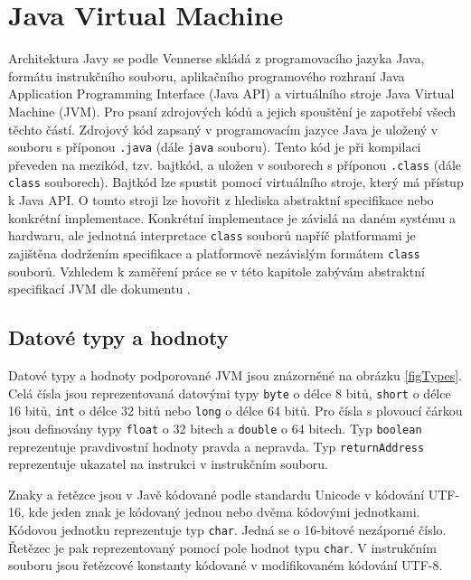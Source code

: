 \chapter{Java Virtual Machine}\label{JVM}

Architektura Javy se podle Vennerse \cite{Venners:InsideJVM} skládá z programovacího jazyka Java, formátu instrukčního souboru, aplikačního programového rozhraní Java Application Programming Interface (Java API) a virtuálního stroje Java Virtual Machine (JVM). Pro psaní zdrojových kódů a jejich spouštění je zapotřebí všech těchto částí.
Zdrojový kód zapsaný v programovacím jazyce Java je uložený v souboru s příponou \texttt{.java} (dále \texttt{java} souboru). Tento kód je při kompilaci převeden na mezikód, tzv. bajtkód, a uložen v souborech s příponou \texttt{.class} (dále \texttt{class} souborech). Bajtkód lze spustit pomocí virtuálního stroje, který má přístup k Java API. O tomto stroji lze  hovořit z hlediska abstraktní specifikace nebo konkrétní implementace. Konkrétní implementace je závislá na daném systému a hardwaru, ale jednotná interpretace \texttt{class} souborů napříč platformami je zajištěna dodržením specifikace a platformově nezávislým formátem \texttt{class} souborů. Vzhledem k zaměření práce se v této kapitole zabývám abstraktní specifikací JVM dle dokumentu \cite{Lindholm:JVM}. 

\section{Datové typy a hodnoty}\label{JVMTypes}

Datové typy a hodnoty podporované JVM jsou znázorněné na obrázku \ref{figTypes}. Celá čísla jsou reprezentovaná datovými typy \texttt{byte} o délce 8 bitů, \texttt{short} o délce 16 bitů, \texttt{int} o délce 32 bitů nebo \texttt{long} o délce 64 bitů. Pro čísla s plovoucí čárkou jsou definovány typy \texttt{float} o 32 bitech a \texttt{double} o 64 bitech. Typ \texttt{boolean} reprezentuje pravdivostní hodnoty pravda a nepravda. Typ \texttt{returnAddress} reprezentuje ukazatel na instrukci v instrukčním souboru.

Znaky a řetězce jsou v Javě kódované podle standardu Unicode v kódování UTF-16, kde jeden znak je kódovaný jednou nebo dvěma kódovými jednotkami. Kódovou jednotku reprezentuje typ \texttt{char}. Jedná se o 16-bitové nezáporné číslo. Řetězec je pak reprezentovaný pomocí pole hodnot typu \texttt{char}. V instrukčním souboru jsou řetězcové konstanty kódované v modifikovaném kódování UTF-8. 

